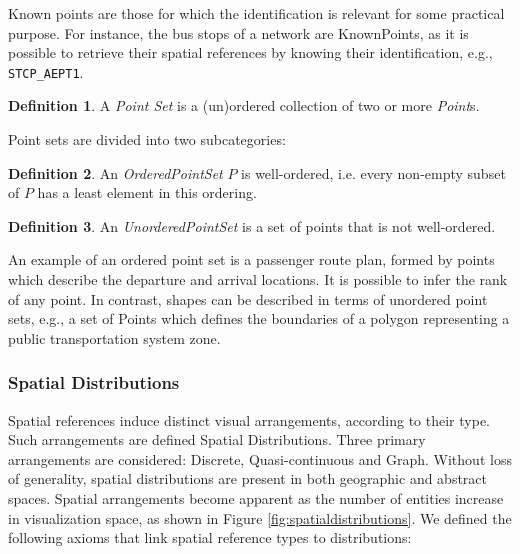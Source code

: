 \documentclass[]{interact}
\theoremstyle{plain}%
\theoremstyle{definition}
\theoremstyle{remark}
\theoremstyle{definition}
\newtheorem{defn}{Definition}[section]
\begin{document}
\noindent Known points are those for which the identification is relevant for some practical purpose. For instance, the bus stops of a network are KnownPoints, as it is possible to retrieve their spatial references by knowing their identification, e.g., \texttt{STCP\_AEPT1}.

\begin{defn}\label{dfn:pointset}
A \emph{Point Set} is a (un)ordered collection of two or more \emph{Point}s.
\end{defn}

\noindent Point sets are divided into two subcategories:

\begin{defn}
An \emph{OrderedPointSet} $P$ is well-ordered, i.e. every non-empty subset of $P$ has a least element in this ordering.
\end{defn}

\begin{defn}
An \emph{UnorderedPointSet} is a set of points that is not well-ordered.
\end{defn}



\noindent An example of an ordered point set is a passenger route plan, formed by points which describe the departure and arrival locations. It is possible to infer the rank of any point. In contrast, shapes can be described in terms of unordered point sets, e.g., a set of Points which defines the boundaries of a polygon representing a public transportation system zone.


\subsubsection{Spatial Distributions}
\label{sec:spatialdistributions}


Spatial references induce distinct visual arrangements, according to their type. Such arrangements are defined Spatial Distributions. Three primary arrangements are considered: Discrete, Quasi-continuous and Graph. Without loss of generality, spatial distributions are present in both geographic and abstract spaces. Spatial arrangements become apparent as the number of entities increase in visualization space, as shown in Figure \ref{fig:spatialdistributions}. We defined the following axioms that link spatial reference types to distributions:
\end{document}
